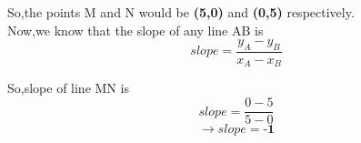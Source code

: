 \documentclass[journal,12pt,twocolumn]{IEEEtran}
\begin{document}
So,the points M and N would be \textbf{(5,0)} and \textbf{(0,5)} respectively.\\

Now,we know that the slope of any line AB is
 \begin{equation}
 slope=\frac{y_A-y_B}{x_A-x_B}
\end{equation}

So,slope of line MN is
 \begin{equation*}
 slope=\frac{0-5}{5-0}
 \end{equation*}
  \begin{equation}
  \rightarrow slope=\textbf{-1}
  \end{equation}
\end{document}
